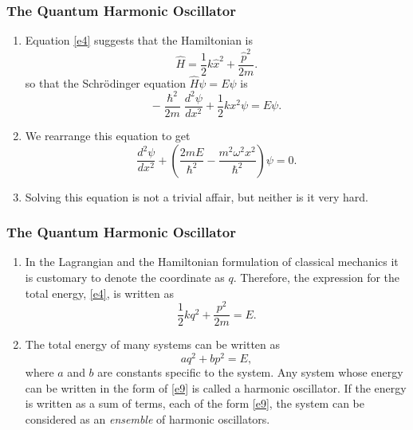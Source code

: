 \documentclass{beamer}
\begin{document}
\begin{frame}
\frametitle{The Quantum Harmonic Oscillator}
\begin{enumerate}
\item Equation \eqref{e4} suggests that the Hamiltonian is
\begin{equation}\label{e5}
\hat{H} = \frac{1}{2}k\hat{x}^2 + \frac{\hat{p}^2}{2m}.
\end{equation}
so that the Schr\"{o}dinger equation $\hat{H}\psi = E\psi$ is
\begin{equation}\label{e6}
-\frac{\hslash^2}{2m}\frac{d^2\psi}{dx^2} + \frac{1}{2}kx^2\psi = E\psi.
\end{equation}
\item We rearrange this equation to get
\begin{equation}\label{e7}
\frac{d^2\psi}{dx^2} + \left(\frac{2mE}{\hslash^2} - 
\frac{m^2\omega^2 x^2}{\hslash^2}\right)\psi = 0.
\end{equation}
\item Solving this equation is not a trivial affair, but neither is it very 
hard. 
\end{enumerate}
\end{frame}

\begin{frame}
\frametitle{The Quantum Harmonic Oscillator}
\begin{enumerate}
\item In the Lagrangian and the Hamiltonian formulation of classical mechanics
it is customary to denote the coordinate as $q$. Therefore, the expression for
the total energy, \eqref{e4}, is written as
\begin{equation}\label{e8}
\frac{1}{2}kq^2 + \frac{p^2}{2m} = E.
\end{equation}
\item The total energy of many systems can be written as 
\begin{equation}\label{e9}
aq^2 + bp^2 = E,
\end{equation}
where $a$ and $b$ are constants specific to the system. Any system whose energy
can be written in the form of \eqref{e9} is called a harmonic oscillator. If
the energy is written as a sum of terms, each of the form \eqref{e9}, the system
can be considered as an \emph{ensemble} of harmonic oscillators.
\end{enumerate}
\end{frame}
\end{document}
